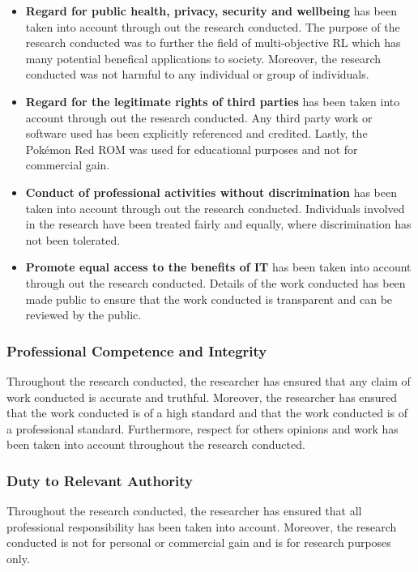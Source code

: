 \begin{itemize}
    \item \textbf{Regard for public health, privacy, security and wellbeing} has been taken into account through out the research conducted. The purpose of the research conducted was to further the field of multi-objective RL which has many potential benefical applications to society. Moreover, the research conducted was not harmful to any individual or group of individuals.
    
    \item \textbf{Regard for the legitimate rights of third parties} has been taken into account through out the research conducted. Any third party work or software used has been explicitly referenced and credited. Lastly, the Pokémon Red ROM was used for educational purposes and not for commercial gain.
    
    \item \textbf{Conduct of professional activities without discrimination} has been taken into account through out the research conducted. Individuals involved in the research have been treated fairly and equally, where discrimination has not been tolerated.

    \item \textbf{Promote equal access to the benefits of IT} has been taken into account through out the research conducted. Details of the work conducted has been made public to ensure that the work conducted is transparent and can be reviewed by the public.
\end{itemize}

\subsubsection*{Professional Competence and Integrity}

Throughout the research conducted, the researcher has ensured that any claim of work conducted is accurate and truthful. Moreover, the researcher has ensured that the work conducted is of a high standard and that the work conducted is of a professional standard. Furthermore, respect for others opinions and work has been taken into account throughout the research conducted. 

\subsubsection*{Duty to Relevant Authority}

Throughout the research conducted, the researcher has ensured that all professional responsibility has been taken into account. Moreover, the research conducted is not for personal or commercial gain and is for research purposes only. 